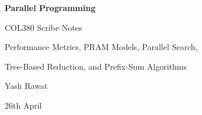 \begin{titlepage}
  \centering
  \vspace*{1.0in}
  {\LARGE\bfseries Parallel Programming\par}
  \vspace{0.18in}
  {\large COL380 Scribe Notes\par}
  \vspace{0.5in}
  {\normalsize Performance Metrics, PRAM Models, Parallel Search,\par}
  {\normalsize Tree-Based Reduction, and Prefix-Sum Algorithms\par}
  \vspace{0.7in}
  {\large Yash Rawat\par}
  \vfill
  {\normalsize 26th April\par}
\end{titlepage}
